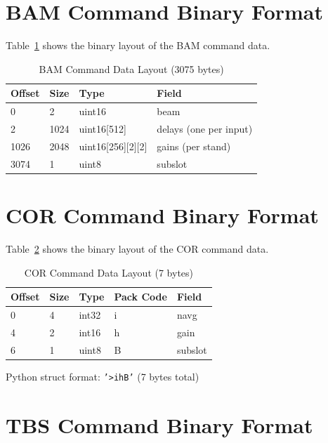 \section{BAM Command Binary Format}

Table~\ref{tab:bam-layout} shows the binary layout of the BAM command data.

\begin{table}[htbp]
    \centering
    \caption{BAM Command Data Layout (3075 bytes)}
    \label{tab:bam-layout}
    \begin{tabular}{llll}
        \toprule
        \textbf{Offset} & \textbf{Size} & \textbf{Type} & \textbf{Field} \\
        \midrule
        0 & 2 & uint16 & beam \\
        2 & 1024 & uint16[512] & delays (one per input) \\
        1026 & 2048 & uint16[256][2][2] & gains (per stand) \\
        3074 & 1 & uint8 & subslot \\
        \bottomrule
    \end{tabular}
\end{table}

\section{COR Command Binary Format}

Table~\ref{tab:cor-cmd-layout} shows the binary layout of the COR command data.

\begin{table}[htbp]
    \centering
    \caption{COR Command Data Layout (7 bytes)}
    \label{tab:cor-cmd-layout}
    \begin{tabular}{lllll}
        \toprule
        \textbf{Offset} & \textbf{Size} & \textbf{Type} & \textbf{Pack Code} & \textbf{Field} \\
        \midrule
        0 & 4 & int32 & i & navg \\
        4 & 2 & int16 & h & gain \\
        6 & 1 & uint8 & B & subslot \\
        \bottomrule
    \end{tabular}
\end{table}

Python struct format: \texttt{'>ihB'} (7 bytes total)

\section{TBS Command Binary Format}

